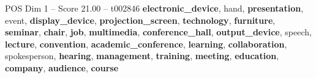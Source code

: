 \begin{textsample}{POS Dim 1 – Score 21.00 – t002846}  \label{ex:f1_pos_040}
\textbf{electronic\_device}, hand, \textbf{presentation}, event, \textbf{display\_device}, \textbf{projection\_screen}, \textbf{technology}, \textbf{furniture}, \textbf{seminar}, \textbf{chair}, \textbf{job}, \textbf{multimedia}, \textbf{conference\_hall}, \textbf{output\_device}, speech, \textbf{lecture}, \textbf{convention}, \textbf{academic\_conference}, \textbf{learning}, \textbf{collaboration}, spokesperson, \textbf{hearing}, \textbf{management}, \textbf{training}, \textbf{meeting}, \textbf{education}, \textbf{company}, \textbf{audience}, \textbf{course}

\end{textsample}
